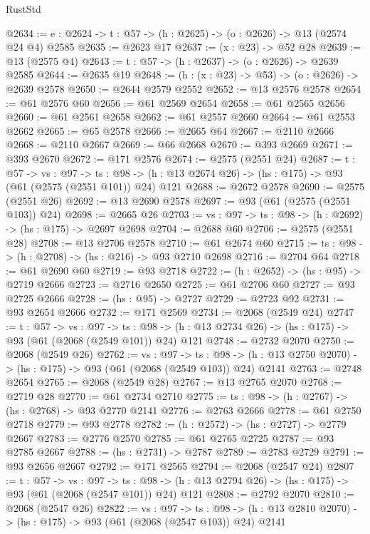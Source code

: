 \begin{lexlean}{RustStd}
\begin{coremodule}
@2634 := {e : @2624} -> {t : @57} -> (h : @2625) -> (o : @2626) -> @13 (@2574 @24 @4) @2585
@2635 := @2623 @17
@2637 := (x : @23) -> @52 @28
@2639 := @13 (@2575 @4)
@2643 := {t : @57} -> (h : @2637) -> (o : @2626) -> @2639 @2585
@2644 := @2635 @19
@2648 := (h : (x : @23) -> @53) -> (o : @2626) -> @2639 @2578
@2650 := @2644 @2579 @2552
@2652 := @13 @2576 @2578
@2654 := @61 @2576 @60
@2656 := @61 @2569 @2654
@2658 := @61 @2565 @2656
@2660 := @61 @2561 @2658
@2662 := @61 @2557 @2660
@2664 := @61 @2553 @2662
@2665 := @65 @2578
@2666 := @2665 @64
@2667 := @2110 @2666
@2668 := @2110 @2667
@2669 := @66 @2668
@2670 := @393 @2669
@2671 := @393 @2670
@2672 := @171 @2576
@2674 := @2575 (@2551 @24)
@2687 := {t : @57} ->
  {vs : @97} ->
  {ts : @98} -> (h : @13 @2674 @26) -> (hs : @175) -> @93 (@61 (@2575 (@2551 @101)) @24) @121
@2688 := @2672 @2578
@2690 := @2575 (@2551 @26)
@2692 := @13 @2690 @2578
@2697 := @93 (@61 (@2575 (@2551 @103)) @24)
@2698 := @2665 @26
@2703 := {vs : @97} -> {ts : @98} -> (h : @2692) -> (hs : @175) -> @2697 @2698
@2704 := @2688 @60
@2706 := @2575 (@2551 @28)
@2708 := @13 @2706 @2578
@2710 := @61 @2674 @60
@2715 := {ts : @98} -> (h : @2708) -> (hs : @216) -> @93 @2710 @2698
@2716 := @2704 @64
@2718 := @61 @2690 @60
@2719 := @93 @2718
@2722 := (h : @2652) -> (hs : @95) -> @2719 @2666
@2723 := @2716 @2650
@2725 := @61 @2706 @60
@2727 := @93 @2725 @2666
@2728 := (hs : @95) -> @2727
@2729 := @2723 @92
@2731 := @93 @2654 @2666
@2732 := @171 @2569
@2734 := @2068 (@2549 @24)
@2747 := {t : @57} ->
  {vs : @97} ->
  {ts : @98} -> (h : @13 @2734 @26) -> (hs : @175) -> @93 (@61 (@2068 (@2549 @101)) @24) @121
@2748 := @2732 @2070
@2750 := @2068 (@2549 @26)
@2762 := {vs : @97} ->
  {ts : @98} -> (h : @13 @2750 @2070) -> (hs : @175) -> @93 (@61 (@2068 (@2549 @103)) @24) @2141
@2763 := @2748 @2654
@2765 := @2068 (@2549 @28)
@2767 := @13 @2765 @2070
@2768 := @2719 @28
@2770 := @61 @2734 @2710
@2775 := {ts : @98} -> (h : @2767) -> (hs : @2768) -> @93 @2770 @2141
@2776 := @2763 @2666
@2778 := @61 @2750 @2718
@2779 := @93 @2778
@2782 := (h : @2572) -> (hs : @2727) -> @2779 @2667
@2783 := @2776 @2570
@2785 := @61 @2765 @2725
@2787 := @93 @2785 @2667
@2788 := (hs : @2731) -> @2787
@2789 := @2783 @2729
@2791 := @93 @2656 @2667
@2792 := @171 @2565
@2794 := @2068 (@2547 @24)
@2807 := {t : @57} ->
  {vs : @97} ->
  {ts : @98} -> (h : @13 @2794 @26) -> (hs : @175) -> @93 (@61 (@2068 (@2547 @101)) @24) @121
@2808 := @2792 @2070
@2810 := @2068 (@2547 @26)
@2822 := {vs : @97} ->
  {ts : @98} -> (h : @13 @2810 @2070) -> (hs : @175) -> @93 (@61 (@2068 (@2547 @103)) @24) @2141

\end{coremodule}
\end{lexlean}
